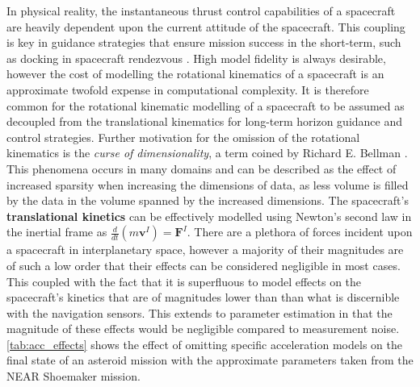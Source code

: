 In physical reality, the instantaneous thrust control capabilities of a
spacecraft are heavily dependent upon the current attitude of the spacecraft.
This coupling is key in guidance strategies that ensure mission success in the
short-term, such as docking in spacecraft rendezvous \cite{Hovell2021}. High
model fidelity is always desirable, however the cost of modelling the rotational
kinematics of a spacecraft is an approximate twofold expense in computational
complexity. It is therefore common for the rotational kinematic modelling of a
spacecraft to be assumed as decoupled from the translational kinematics for
long-term horizon guidance and control strategies. Further motivation for the
omission of the rotational kinematics is the \textit{curse of dimensionality}, a
term coined by Richard E. Bellman \cite{bellman1957dynamic}
\cite{bellman1961adaptive}. This phenomena occurs in many domains and can be
described as the effect of increased sparsity when increasing the dimensions of
data, as less volume is filled by the data in the volume spanned by the
increased dimensions. The spacecraft's \textbf{translational kinetics} can be
effectively modelled using Newton's second law in the inertial frame as
$\frac{d}{dt}(m\textbf{v}^I)=\textbf{F}^I$. There are a plethora of forces
incident upon a spacecraft in interplanetary space, however a majority of their
magnitudes are of such a low order that their effects can be considered
negligible in most cases. This coupled with the fact that it is superfluous to
model effects on the spacecraft's kinetics that are of magnitudes lower than
than what is discernible with the navigation sensors. This extends to parameter
estimation in that the magnitude of these effects would be negligible compared
to measurement noise. \autoref{tab:acc_effects} shows the effect of omitting
specific acceleration models on the final state of an asteroid mission with the
approximate parameters taken from the NEAR Shoemaker mission.

